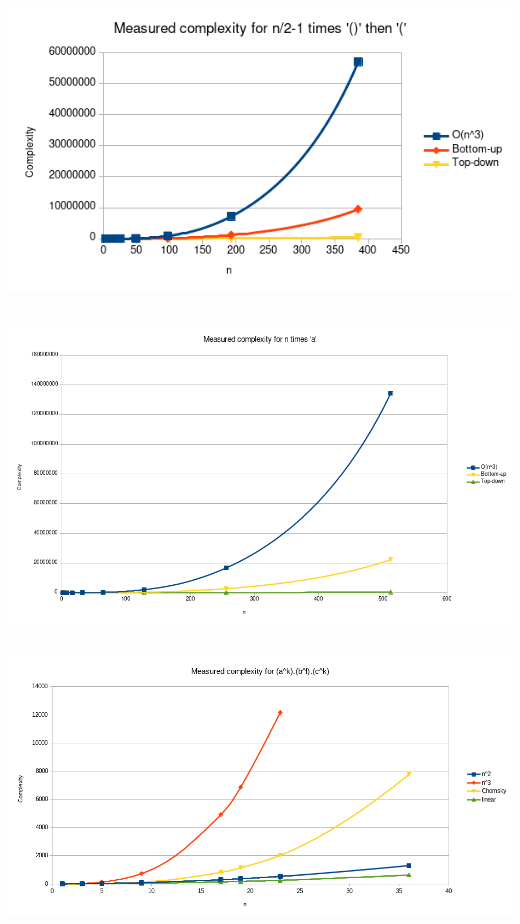 \documentclass[twocolumn]{article}
\begin{document}
\subsection{ }
\begin{center}
  \label{fig:plro}
  \includegraphics[width=\textwidth]{paren/complexity_paren_left_right_opening}
\end{center}
\newpage
\subsection{ }
\begin{center}
  \label{fig:as}
  \includegraphics[width=\textwidth]{as/as}
\end{center}

\newpage
\subsection{ }
\begin{center}
  \label{fig:complexity_as_bs_cs}
  \includegraphics[width=\textwidth]{linear/complexity_as_bs_cs}
\end{center}
\end{document}
